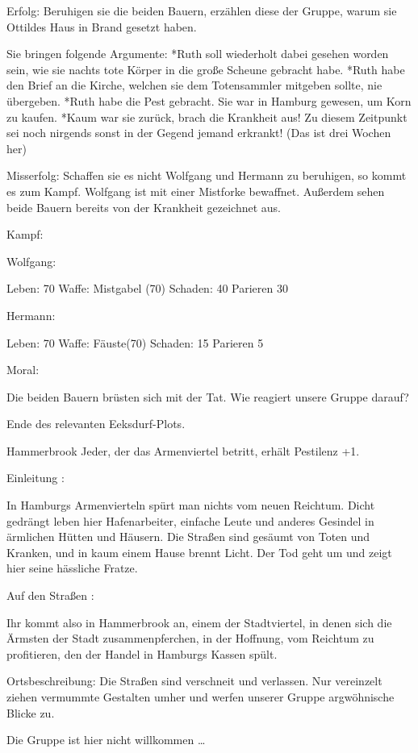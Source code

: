 Erfolg: Beruhigen sie die beiden Bauern, erzählen diese der Gruppe, warum sie Ottildes Haus in Brand gesetzt haben.

Sie bringen folgende Argumente:
*Ruth soll wiederholt dabei gesehen worden sein, wie sie nachts tote Körper in die große Scheune gebracht habe.
*Ruth habe den Brief an die Kirche, welchen sie dem Totensammler mitgeben sollte, nie übergeben.
*Ruth habe die Pest gebracht. Sie war in Hamburg gewesen, um Korn zu kaufen.
*Kaum war sie zurück, brach die Krankheit aus! Zu diesem Zeitpunkt sei noch nirgends sonst in der Gegend jemand erkrankt! (Das ist drei Wochen her)

Misserfolg: Schaffen sie es nicht Wolfgang und Hermann zu beruhigen, so kommt es zum Kampf.
Wolfgang ist mit einer Mistforke bewaffnet. Außerdem sehen beide Bauern bereits von der Krankheit gezeichnet aus.

Kampf:

Wolfgang:

Leben: 70
Waffe: Mistgabel (70)
Schaden: 40
Parieren 30

Hermann:

Leben: 70
Waffe: Fäuste(70)
Schaden: 15
Parieren 5

Moral:

Die beiden Bauern brüsten sich mit der Tat. Wie reagiert unsere Gruppe darauf?


Ende des relevanten Eeksdurf-Plots.

Hammerbrook
Jeder, der das Armenviertel betritt, erhält Pestilenz +1.

Einleitung
:

In Hamburgs Armenvierteln spürt man nichts vom neuen Reichtum. Dicht gedrängt leben hier Hafenarbeiter, einfache Leute und anderes Gesindel in ärmlichen Hütten und Häusern. Die Straßen sind gesäumt von Toten und Kranken, und in kaum einem Hause brennt Licht. Der Tod geht um und zeigt hier seine hässliche Fratze.

Auf den Straßen
:

Ihr kommt also in Hammerbrook an, einem der Stadtviertel, in denen sich die Ärmsten der Stadt zusammenpferchen, in der Hoffnung, vom Reichtum zu profitieren, den der Handel in Hamburgs Kassen spült.

Ortsbeschreibung: Die Straßen sind verschneit und verlassen. Nur vereinzelt ziehen vermummte Gestalten umher und werfen unserer Gruppe argwöhnische Blicke zu.

Die Gruppe ist hier nicht willkommen …

